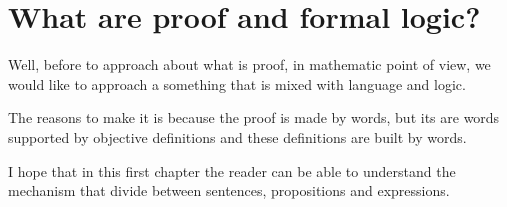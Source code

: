 \chapter{What are proof and formal logic?}
Well, before to approach about what is proof, in mathematic point of view, we would like to approach a something that is mixed with language and logic.

The reasons to make it is because the proof is made by words, but its are words supported by objective definitions and these definitions are built by words.

I hope that in this first chapter the reader can be able to understand the mechanism that divide between sentences, propositions and expressions.


